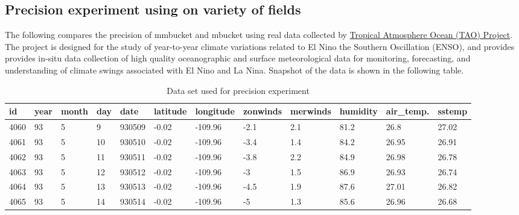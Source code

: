 \subsection*{Precision experiment using on variety of fields}

The following compares the precision of mmbucket and mbucket using real data collected by \href{http://www.pmel.noaa.gov/tao/}{Tropical Atmosphere Ocean (TAO) Project}. The project is designed for the study of year-to-year climate variations related to El Nino the Southern Oscillation (ENSO), and provides provides in-situ data collection of high quality oceanographic and surface meteorological data for monitoring, forecasting, and understanding of climate swings associated with El Nino and La Nina.  Snapshot of the data is shown in the following table. \\



\begin{table}[hbt]
\begin{center}
\caption{Data set used for precision experiment }
{\footnotesize
\begin{tabular}{l|l|l|l|l|l|l|l|l|l|l|l}\hline
id & year & month & day & date & latitude & longitude & zonwinds & merwinds & humidity & air\_temp. &sstemp \\ \hline
4060 & 93 &5 & 9 & 930509 & -0.02 & -109.96 & -2.1 & 2.1 & 81.2 & 26.8 & 27.02\\
4061 & 93 & 5 & 10 & 930510 & -0.02 & -109.96 & -3.4 & 1.4 & 84.2 & 26.95 & 26.91\\
4062 & 93 & 5 & 11 & 930511 & -0.02 & -109.96 & -3.8 & 2.2 & 84.9 & 26.98 & 26.78\\
4063 & 93 & 5 & 12 & 930512 & -0.02 & -109.96 & -3 & 1.5 & 86.9 & 26.93 & 26.74\\
4064 & 93 & 5 & 13 & 930513 & -0.02 & -109.96 & -4.5 & 1.9 & 87.6 & 27.01 & 26.82\\
4065 & 93 & 5 & 14 & 930514 & -0.02 & -109.96 & -5    & 1.3 & 85.6 & 26.96 & 26.68\\
\hline
\end{tabular}
\\
}
\end{center}
\end{table}

